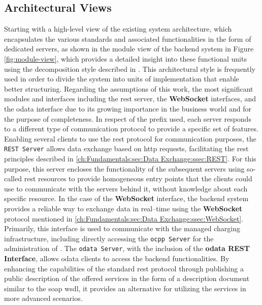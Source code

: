 \subsection{Architectural Views}
\label{ch:Implementation:sec:Reservation System:ssec:System Architecture}

Starting with a high-level view of the existing system architecture, which encapsulates the various standards and associated functionalities in the form of dedicated servers, as shown in the module view of the backend system in Figure \ref{fig:module-view}, which provides a detailed insight into these functional units using the decomposition style described in \cite[p.~67]{clements_documenting_2011}. This architectural style is frequently used in order to divide the system into units of implementation that enable better structuring.
Regarding the assumptions of this work, the most significant modules and interfaces including the \acrshort{rest} server, the \textbf{WebSocket} interfaces, and the \acrshort{odata} interface due to its growing importance in the business world and for the purpose of completeness.
In respect of the prefix used, each server responds to a different type of communication protocol to provide a specific set of features.
Enabling several clients to use the \acrshort{rest} protocol for communication purposes, the \texttt{REST Server} allows data exchange based on \acrshort{http} requests, facilitating the \acrshort{rest} principles described in \ref{ch:Fundamentals:sec:Data Exchange:ssec:REST}. 
For this purpose, this server encloses the functionality of the subsequent servers using so-called \acrshort{rest} resources to provide homogeneous entry points that the clients could use to communicate with the servers behind it, without knowledge about each specific resource. 
In the case of the \textbf{WebSocket} interface, the backend system provides a reliable way to exchange data in real--time using the \textbf{WebSocket} protocol mentioned in \ref{ch:Fundamentals:sec:Data Exchange:ssec:WebSocket}. 
Primarily, this interface is used to communicate with the managed charging infrastructure, including directly accessing the \texttt{\acrshort{ocpp} Server} for the administration of .
The \texttt{\acrshort{odata} Server}, with the inclusion of the \textbf{\acrshort{odata} REST Interface}, allows \acrshort{odata} clients to access the backend functionalities. By enhancing the capabilities of the standard \acrshort{rest} protocol through publishing a public description of the offered services in the form of a description document similar to the \acrshort{soap} \acrshort{wsdl}, it provides an alternative for utilizing the services in more advanced scenarios.

